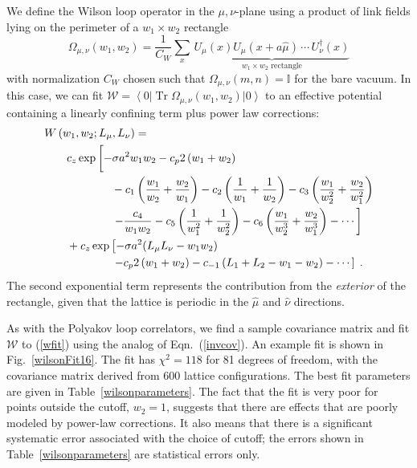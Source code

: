 \documentclass[preprint,aps,prd]{revtex4-2}
\newcommand{\be}{\begin{equation}}
\newcommand{\eq}{\end{equation}}
\newcommand\wilson[4]{\Omega_{#1, #2}\left(#3,#4\right)}
\DeclareMathOperator{\Tr}{Tr}
\newcommand{\cNorm}{c_z}
\begin{document}
We define the Wilson loop operator in the $\mu,\nu$-plane using a product of
link fields lying on the perimeter of a $w_1\times w_2$ rectangle
\be
       \wilson{\mu}{\nu}{w_1}{w_2} = \frac{1}{C_W} \sum_{x}\,
         \underbrace{U_\mu(x) U_\mu(x+a \hat{\mu}) \,\cdots\, U_\nu^\dagger (x)
         }_{\mbox{$w_1\times w_2$ rectangle}}
\eq
with normalization $C_W$ chosen such that $\wilson{\mu}{\nu}{m}{n} = \mathbb{I}$
for the bare vacuum.  In this case, we can fit
$\mathcal{W} = \left\langle 0 \right|
 \Tr \wilson{\mu}{\nu}{w_1}{w_2} \left|0\right\rangle $
to an effective potential containing a linearly confining term
plus power law corrections:
%
\begin{align}
  \MoveEqLeft W\left(w_1, w_2; L_\mu, L_\nu\right) =  \nonumber \\
       &  \cNorm \exp\left[
       -\sigma a^2 w_1 w_2 
       - c_p  2\left(w_1+w_2\right)
       \vphantom{\frac{w_1}{w_2}}\right. \nonumber \\ & \hspace{4em}
        - c_1 \left(\frac{w_1}{w_2}+\frac{w_2}{w_1}\right)
           - c_2 \left(\frac{1}{w_1}+\frac{1}{w_2}\right)
           - c_3 \left(\frac{w_1}{w_2^2}+\frac{w_2}{w_1^2}\right)
           \nonumber \\ & \hspace{4em} \left.
           - \frac{c_4}{w_1 w_2}
           - c_5 \left(\frac{1}{w_1^2}+\frac{1}{w_2^2}\right)
           - c_6 \left(\frac{w_1}{w_2^3}+\frac{w_2}{w_1^3}\right) - \cdots
       \right]\nonumber\\ &
      \mbox{} + \cNorm \exp\left[
       -\sigma a^2 (L_\mu L_\nu - w_1 w_2)
       \right. \nonumber \\ & \hspace{4em} \left.
       - c_p  2\left(w_1+w_2\right)
     - c_{-1}\left(L_1 +L_2 - w_1 -w_2\right) - \cdots
     \right]\; .  \label{wfit}
\end{align}
%
The second exponential term represents the contribution from
the {\em exterior} of the rectangle, given that the lattice
is periodic in the $\hat{\mu}$ and $\hat\nu$ directions.

As with the Polyakov loop correlators, we find a sample
covariance matrix and fit $\mathcal{W}$ to (\ref{wfit})
using the analog of Eqn.~(\ref{invcov}).
An example fit is shown in Fig.~\ref{wilsonFit16}.  
The fit has $\chi^2=118$ for 81 degrees of freedom,
with the covariance matrix derived from 600 lattice configurations.
The best fit parameters are given in Table~\ref{wilsonparameters}.
The fact that the fit is very poor for points outside the cutoff,
$w_2 = 1$, suggests that there are effects that are poorly modeled
by power-law corrections.  It also means that
there is a significant systematic error associated with the choice
of cutoff; the errors shown in Table~\ref{wilsonparameters} are
statistical errors only.
\end{document}
